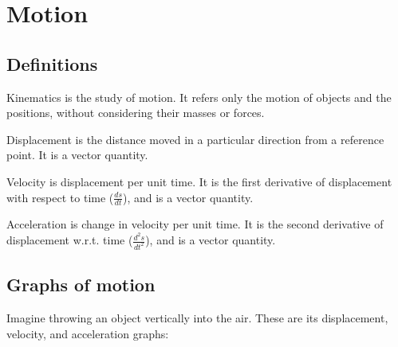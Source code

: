  

\section{Motion}

\subsection{Definitions}

Kinematics is the study of motion. It refers only the motion of objects and the positions, without considering their masses or forces.

\begin{definition}
	Displacement is the distance moved in a particular direction from a reference point. It is a vector quantity.
\end{definition}

\begin{definition}
	Velocity is displacement per unit time. It is the first derivative of displacement with respect to time ($\frac{ds}{dt}$), and is a vector quantity.
\end{definition}

\begin{definition}
	Acceleration is change in velocity per unit time. It is the second derivative of displacement w.r.t. time ($\frac{d^2s}{dt^2}$), and is a vector quantity.
\label{def:accel}
\end{definition}

\subsection{Graphs of motion}

Imagine throwing an object vertically into the air. These are its displacement, velocity, and acceleration graphs:


